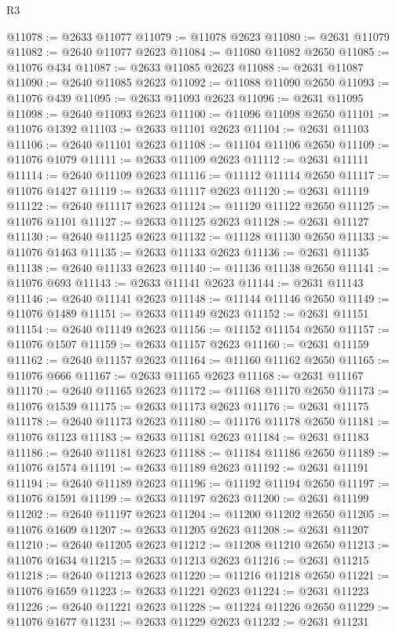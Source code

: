 \begin{lexlean}{R3}
\begin{coremodule}
@11078 := @2633 @11077
@11079 := @11078 @2623
@11080 := @2631 @11079
@11082 := @2640 @11077 @2623
@11084 := @11080 @11082 @2650
@11085 := @11076 @434
@11087 := @2633 @11085 @2623
@11088 := @2631 @11087
@11090 := @2640 @11085 @2623
@11092 := @11088 @11090 @2650
@11093 := @11076 @439
@11095 := @2633 @11093 @2623
@11096 := @2631 @11095
@11098 := @2640 @11093 @2623
@11100 := @11096 @11098 @2650
@11101 := @11076 @1392
@11103 := @2633 @11101 @2623
@11104 := @2631 @11103
@11106 := @2640 @11101 @2623
@11108 := @11104 @11106 @2650
@11109 := @11076 @1079
@11111 := @2633 @11109 @2623
@11112 := @2631 @11111
@11114 := @2640 @11109 @2623
@11116 := @11112 @11114 @2650
@11117 := @11076 @1427
@11119 := @2633 @11117 @2623
@11120 := @2631 @11119
@11122 := @2640 @11117 @2623
@11124 := @11120 @11122 @2650
@11125 := @11076 @1101
@11127 := @2633 @11125 @2623
@11128 := @2631 @11127
@11130 := @2640 @11125 @2623
@11132 := @11128 @11130 @2650
@11133 := @11076 @1463
@11135 := @2633 @11133 @2623
@11136 := @2631 @11135
@11138 := @2640 @11133 @2623
@11140 := @11136 @11138 @2650
@11141 := @11076 @693
@11143 := @2633 @11141 @2623
@11144 := @2631 @11143
@11146 := @2640 @11141 @2623
@11148 := @11144 @11146 @2650
@11149 := @11076 @1489
@11151 := @2633 @11149 @2623
@11152 := @2631 @11151
@11154 := @2640 @11149 @2623
@11156 := @11152 @11154 @2650
@11157 := @11076 @1507
@11159 := @2633 @11157 @2623
@11160 := @2631 @11159
@11162 := @2640 @11157 @2623
@11164 := @11160 @11162 @2650
@11165 := @11076 @666
@11167 := @2633 @11165 @2623
@11168 := @2631 @11167
@11170 := @2640 @11165 @2623
@11172 := @11168 @11170 @2650
@11173 := @11076 @1539
@11175 := @2633 @11173 @2623
@11176 := @2631 @11175
@11178 := @2640 @11173 @2623
@11180 := @11176 @11178 @2650
@11181 := @11076 @1123
@11183 := @2633 @11181 @2623
@11184 := @2631 @11183
@11186 := @2640 @11181 @2623
@11188 := @11184 @11186 @2650
@11189 := @11076 @1574
@11191 := @2633 @11189 @2623
@11192 := @2631 @11191
@11194 := @2640 @11189 @2623
@11196 := @11192 @11194 @2650
@11197 := @11076 @1591
@11199 := @2633 @11197 @2623
@11200 := @2631 @11199
@11202 := @2640 @11197 @2623
@11204 := @11200 @11202 @2650
@11205 := @11076 @1609
@11207 := @2633 @11205 @2623
@11208 := @2631 @11207
@11210 := @2640 @11205 @2623
@11212 := @11208 @11210 @2650
@11213 := @11076 @1634
@11215 := @2633 @11213 @2623
@11216 := @2631 @11215
@11218 := @2640 @11213 @2623
@11220 := @11216 @11218 @2650
@11221 := @11076 @1659
@11223 := @2633 @11221 @2623
@11224 := @2631 @11223
@11226 := @2640 @11221 @2623
@11228 := @11224 @11226 @2650
@11229 := @11076 @1677
@11231 := @2633 @11229 @2623
@11232 := @2631 @11231

\end{coremodule}
\end{lexlean}
